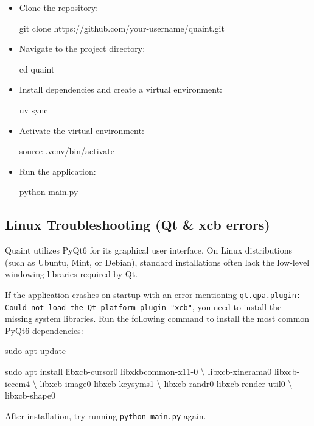 \documentclass[11pt, a4paper]{article}
\begin{document}
\begin{itemize}
    \item Clone the repository:
          \begin{terminalbox}
              git clone https://github.com/your-username/quaint.git
          \end{terminalbox}

    \item Navigate to the project directory:
          \begin{terminalbox}
              cd quaint
          \end{terminalbox}

    \item Install dependencies and create a virtual environment:
          \begin{terminalbox}
              uv sync
          \end{terminalbox}

    \item Activate the virtual environment:
          \begin{terminalbox}
              source .venv/bin/activate
          \end{terminalbox}

    \item Run the application:
          \begin{terminalbox}
              python main.py
          \end{terminalbox}
\end{itemize}

\subsection{Linux Troubleshooting (Qt \& xcb errors)}
Quaint utilizes PyQt6 for its graphical user interface. On Linux distributions (such as Ubuntu, Mint, or Debian), standard installations often lack the low-level windowing libraries required by Qt.

If the application crashes on startup with an error mentioning \texttt{qt.qpa.plugin: Could not load the Qt platform plugin "xcb"}, you need to install the missing system libraries. Run the following command to install the most common PyQt6 dependencies:

\begin{terminalbox}
    sudo apt update
\end{terminalbox}
\begin{terminalbox}
    sudo apt install libxcb-cursor0 libxkbcommon-x11-0 \textbackslash
    libxcb-xinerama0 libxcb-icccm4 \textbackslash
    libxcb-image0 libxcb-keysyms1 \textbackslash
    libxcb-randr0 libxcb-render-util0 \textbackslash
    libxcb-shape0
\end{terminalbox}
After installation, try running \texttt{python main.py} again.
\end{document}
